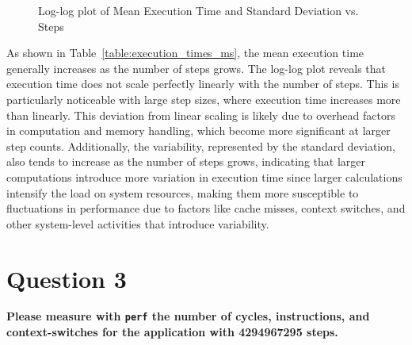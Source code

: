 \documentclass{article}
\begin{document}
\begin{figure}[h!]
\centering
{}
\caption{Log-log plot of Mean Execution Time and Standard Deviation vs. Steps}
\label{fig:execution_time_vs_steps}
\end{figure}
    
As shown in Table~\ref{table:execution_times_ms}, the mean execution time generally increases as the number of steps grows. The log-log plot reveals that execution time does not scale perfectly linearly with the number of steps. This is particularly noticeable with large step sizes, where execution time increases more than linearly. This deviation from linear scaling is likely due to overhead factors in computation and memory handling, which become more significant at larger step counts. Additionally, the variability, represented by the standard deviation, also tends to increase as the number of steps grows, indicating that larger computations introduce more variation in execution time since larger calculations intensify the load on system resources, making them more susceptible to fluctuations in performance due to factors like cache misses, context switches, and other system-level activities that introduce variability.


\section*{Question 3}

\textbf{Please measure with \texttt{perf} the number of cycles, instructions, and context-switches for the application with 4294967295 steps.}
\end{document}
